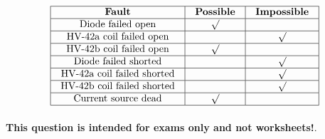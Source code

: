 

$$\vbox{\offinterlineskip
\halign{\strut
\vrule \quad\hfil # \ \hfil & 
\vrule \quad\hfil # \ \hfil & 
\vrule \quad\hfil # \ \hfil \vrule \cr
\noalign{\hrule}
%
{\bf Fault} & {\bf Possible} & {\bf Impossible} \cr
%
\noalign{\hrule}
%
Diode failed open & $\surd$ &  \cr
%
\noalign{\hrule}
%
HV-42a coil failed open &  & $\surd$ \cr
%
\noalign{\hrule}
%
HV-42b coil failed open & $\surd$ &  \cr
%
\noalign{\hrule}
%
Diode failed shorted &  & $\surd$ \cr
%
\noalign{\hrule}
%
HV-42a coil failed shorted &  & $\surd$ \cr
%
\noalign{\hrule}
%
HV-42b coil failed shorted &  & $\surd$ \cr
%
\noalign{\hrule}
%
Current source dead & $\surd$ &  \cr
%
\noalign{\hrule}
} %
}$$ %







{\bf This question is intended for exams only and not worksheets!}.



